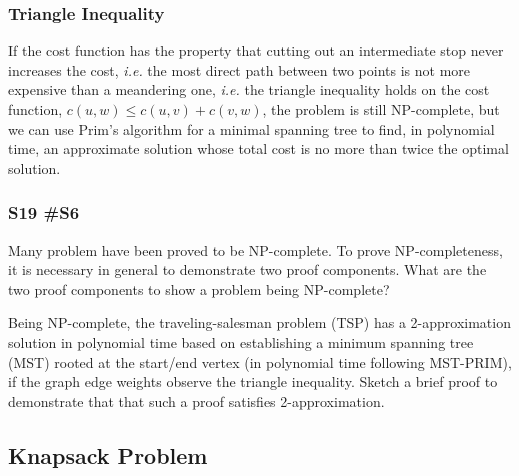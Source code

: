 \subsubsection{Triangle Inequality}

If the cost function has the property that cutting out an intermediate stop never increases the cost, {\it i.e.} the most direct path between two points is not more expensive than a meandering one, {\it i.e.} the triangle inequality holds on the cost function, $c(u,w) \le c(u,v) + c(v,w)$, the problem is still NP-complete, but we can use Prim's algorithm for a minimal spanning tree to find, in polynomial time, an approximate solution whose total cost is no more than twice the optimal solution.  

\subsubsection{	S19 \#S6}
Many problem have been proved to be NP-complete.  To prove NP-completeness, it is necessary in general to demonstrate two proof components.  What are the two proof components to show a problem being NP-complete?
	
	Being NP-complete, the traveling-salesman problem (TSP) has a 2-approximation solution in polynomial time based on establishing a minimum spanning tree (MST) rooted at the start/end vertex (in polynomial time following MST-PRIM), if the graph edge weights observe the triangle inequality.  Sketch a brief proof to demonstrate that that such a proof satisfies 2-approximation.  



\subsection{Knapsack Problem}

